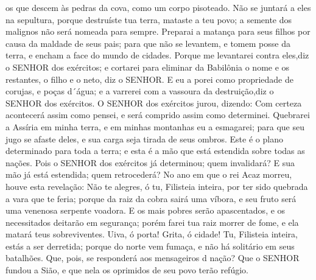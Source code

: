 {{} os que descem às pedras da cova, como um corpo pisoteado.
  Não se juntará a eles na sepultura, porque destruíste tua terra,
{} mataste a teu povo; a semente dos malignos não será nomeada para sempre.
  Preparai a matança para seus filhos por causa da maldade de seus pais; para que não se levantem, e tomem posse da terra, e encham a face do mundo de cidades.
  Porque me levantarei contra eles,diz o SENHOR dos exércitos; e cortarei para eliminar da Babilônia o nome e os restantes, o filho e o neto, diz o SENHOR.
  E eu a porei como propriedade de corujas, e poças d´água; e a varrerei com a vassoura da destruição,diz o SENHOR dos exércitos.
  O SENHOR dos exércitos jurou, dizendo: Com certeza acontecerá assim como pensei, e será comprido assim como determinei.
  Quebrarei a Assíria em minha terra, e em minhas montanhas eu a esmagarei; para que seu jugo se afaste deles, e sua carga seja tirada de seus ombros.
  Este é o plano determinado para toda a terra; e esta é a mão que está estendida sobre todas as nações.
  Pois o SENHOR dos exércitos já determinou; quem invalidará? E sua mão já está estendida; quem
{} retrocederá?
  No ano em que o rei Acaz morreu, houve esta revelação:
  Não te alegres, ó tu, Filisteia inteira, por ter sido quebrada a vara que te feria; porque da raiz da cobra sairá uma víbora, e seu fruto será uma venenosa serpente voadora.
  E os mais pobres
 serão apascentados, e os necessitados deitarão em segurança; porém farei tua raiz morrer de fome, e ela matará teus sobreviventes.
  Uiva, ó porta! Grita, ó cidade! Tu, Filisteia inteira, estás a ser derretida; porque do norte vem fumaça, e não há solitário em seus batalhões.
  Que, pois, se responderá aos mensageiros d
{} nação? Que o SENHOR fundou a Sião, e que nela os oprimidos de seu povo terão refúgio.
\par }

